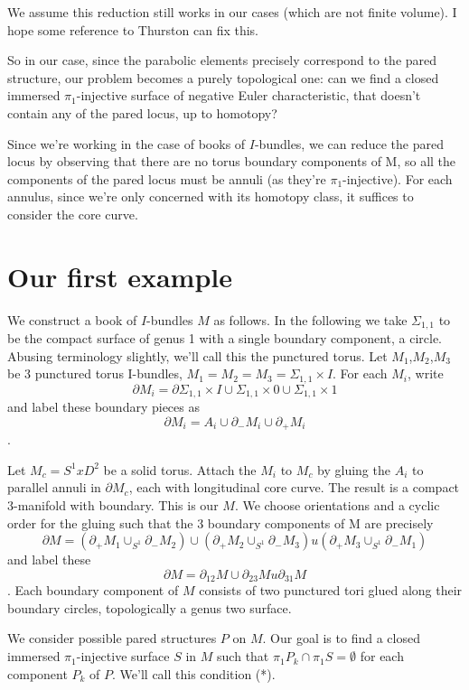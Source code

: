 \documentclass[12pt]{amsart}
\theoremstyle{definition}
\newcommand{\x}{\times}
\newcommand{\bd}{\partial}
\newcommand{\Si}{\Sigma}
\begin{document}
We assume this reduction still works in our cases (which are not finite
volume). I hope some reference to Thurston can fix this.

So in our case, since the parabolic elements precisely correspond to the pared
structure, our problem becomes a purely topological one: can we find a closed
immersed $\pi_1$-injective surface of negative Euler characteristic, that
doesn't contain any of the pared locus, up to homotopy?

Since we're working in the case of books of $I$-bundles, we can reduce the pared
locus by observing that there are no torus boundary components of M, so all the
components of the pared locus must be annuli (as they're $\pi_1$-injective). For
each annulus, since we're only concerned with its homotopy class, it suffices
to consider the core curve.

\section{Our first example}

We construct a book of $I$-bundles $M$ as follows. In the following we take
$\Si_{1,1}$ to be the compact surface of genus 1 with a single boundary
component, a circle.  Abusing terminology slightly, we'll call this the
punctured torus.  Let $M_1$,$M_2$,$M_3$ be 3 punctured torus I-bundles,
$M_1=M_2=M_3=\Si_{1,1}\x I$. For each $M_i$, write
\[
\bd M_i = \bd \Si_{1,1}\x I \cup \Si_{1,1}\x0 \cup \Si_{1,1} \x 1
\]
and label these boundary pieces as
\[
\bd M_i = A_i \cup \bd_- M_i \cup \bd_+M_i
\].

Let $M_c = S^1xD^2$ be a solid torus. Attach the $M_i$ to $M_c$ by gluing the
$A_i$ to parallel annuli in $\bd M_c$, each with longitudinal core curve. The
result is a compact 3-manifold with boundary. This is our $M$. We choose
orientations and a cyclic order for the gluing such that the 3 boundary
components of M are precisely
\[
\bd M = (\bd_+M_1 \cup_{S^1} \bd_-M_2) \cup (\bd_+M_2 \cup_{S^1} \bd_-M_3)
u (\bd_+M_3 \cup_{S^1} \bd_-M_1)
\]
and label these
\[
\bd M=\bd_{12}M \cup \bd_{23}Mu \bd_{31}M
\].
Each boundary
component of $M$ consists of two punctured tori glued along their boundary
circles, topologically a genus two surface.

We consider possible pared structures $P$ on $M$. Our goal is to find a closed
immersed $\pi_1$-injective surface $S$ in $M$ such that $\pi_1P_k \cap \pi_1S
= \emptyset$
for each component $P_k$ of $P$. We'll call this condition (*).
\end{document}
